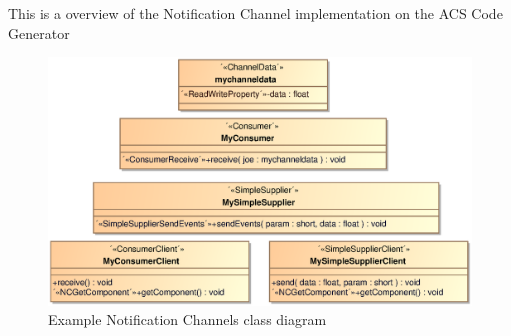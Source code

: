 This is a overview of the Notification Channel implementation on the ACS Code Generator

\begin{figure}[h!t]
\begin{center}
\includegraphics*[scale=0.75]{images/notificationchannel}
\caption{\label{fig:not_chan}Example Notification Channels class diagram}
\end{center}
\end{figure}

%
%


